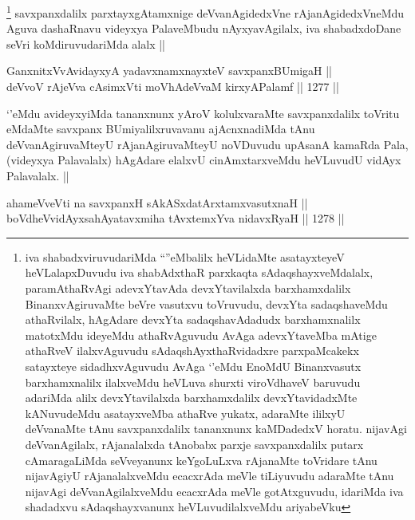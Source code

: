 \begin{artha}
\footnote{iva shabadxviruvudariMda ``\stext''eMbalilx heVLidaMte asatayxteyeV heVLalapxDuvudu iva shabAdxthaR parxkaqta sAdaqshayxveMdalalx, paramAthaRvAgi adevxYtavAda devxYtavilalxda barxhamxdalilx BinanxvAgiruvaMte beVre vasutxvu toVruvudu, devxYta sadaqshaveMdu athaRvilalx, hAgAdare devxYta sadaqshavAdadudx barxhamxnalilx matotxMdu ideyeMdu athaRvAguvudu AvAga adevxYtaveMba mAtige athaRveV ilalxvAguvudu sAdaqshAyxthaRvidadxre parxpaMcakekx satayxteye sidadhxvAguvudu AvAga `\stext'eMdu EnoMdU Binanxvasutx barxhamxnalilx ilalxveMdu heVLuva shurxti viroVdhaveV baruvudu adariMda alilx devxYtavilalxda barxhamxdalilx devxYtavidadxMte kANuvudeMdu asatayxveMba athaRve yukatx, adaraMte ililxyU deVvanaMte tAnu savxpanxdalilx tananxnunx kaMDadedxV horatu. nijavAgi deVvanAgilalx, rAjanalalxda tAnobabx parxje savxpanxdalilx putarx cAmaragaLiMda seVveyanunx keYgoLuLxva rAjanaMte toVridare tAnu nijavAgiyU rAjanalalxveMdu ecacxrAda meVle tiLiyuvudu adaraMte tAnu nijavAgi deVvanAgilalxveMdu ecacxrAda meVle gotAtxguvudu, idariMda iva shadadxvu sAdaqshayxvanunx heVLuvudilalxveMdu ariyabeVku}
savxpanxdalilx parxtayxgAtamxnige deVvanAgidedxVne rAjanAgidedxVneMdu Aguva dashaRnavu videyxya PalaveMbudu nAyxyavAgilalx, iva shabadxdoDane seVri koMdiruvudariMda alalx ||
\end{artha}


\begin{shl}
GanxnitxVvAvidayxyA yadavxnamxnayxteV savxpanxBUmigaH || \\
deVvoV rAjeVva cAsimxVti moVhAdeVvaM kirxyAPalamf ||  1277 ||  
\end{shl}

\begin{artha}
`\stext'eMdu avideyxyiMda tananxnunx yAroV kolulxvaraMte savxpanxdalilx toVritu eMdaMte savxpanx BUmiyalilxruvavanu ajAcnxnadiMda tAnu deVvanAgiruvaMteyU rAjanAgiruvaMteyU noVDuvudu upAsanA kamaRda Pala, (videyxya Palavalalx) hAgAdare elalxvU cinAmxtarxveMdu heVLuvudU vidAyx Palavalalx. ||
\end{artha}


\begin{shl}
ahameVveVti na savxpanxH sAkASxdatArx\s \s tamxvasutxnaH || \\
boVdheV\s vidAyxsahAyatavxmiha tAvxtemxYva nidavxRyaH ||  1278 ||  
\end{shl}

